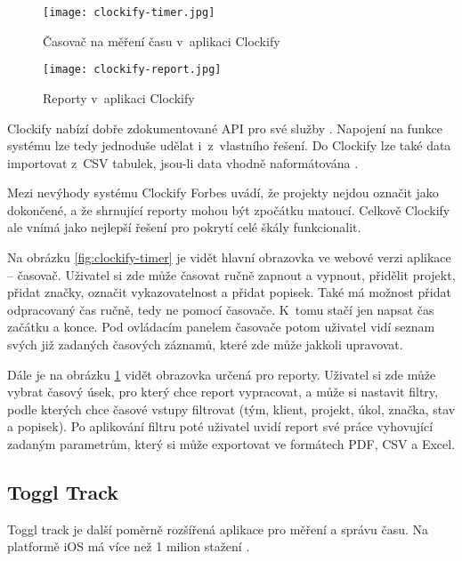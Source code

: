 \begin{figure}[p]
	\centering
	\texttt{[image: clockify-timer.jpg]}
	\caption{Časovač na měření času v~aplikaci Clockify \cite{clockify-features}}
	\label{fig:clockify-timer}
	\vspace{1cm}
	\texttt{[image: clockify-report.jpg]}
	\caption{Reporty v~aplikaci Clockify \cite{clockify-features}}
	\label{fig:clockify-report}
\end{figure}

Clockify nabízí dobře zdokumentované API pro své služby \cite{clockify-api}. Napojení na funkce systému lze tedy jednoduše udělat i~z~vlastního řešení. Do Clockify lze také data importovat z~CSV tabulek, jsou-li data vhodně naformátována \cite{clockify-import-timesheets}.

Mezi nevýhody systému Clockify Forbes uvádí, že projekty nejdou označit jako dokončené, a že shrnující reporty mohou být zpočátku matoucí. Celkově Clockify ale vnímá jako nejlepší řešení pro pokrytí celé škály funkcionalit.

Na obrázku \ref{fig:clockify-timer} je vidět hlavní obrazovka ve webové verzi aplikace – časovač. Uživatel si zde může časovat ručně zapnout a vypnout, přidělit projekt, přidat značky, označit vykazovatelnost a přidat popisek. Také má možnost přidat odpracovaný čas ručně, tedy ne pomocí časovače. K~tomu stačí jen napsat čas začátku a konce. Pod ovládacím panelem časovače potom uživatel vidí seznam svých již zadaných časových záznamů, které zde může jakkoli upravovat.

Dále je na obrázku \ref{fig:clockify-report} vidět obrazovka určená pro reporty. Uživatel si zde může vybrat časový úsek, pro který chce report vypracovat, a může si nastavit filtry, podle kterých chce časové vstupy filtrovat (tým, klient, projekt, úkol, značka, stav a popisek). Po aplikování filtru poté uživatel uvidí report své práce vyhovující zadaným parametrům, který si může exportovat ve formátech PDF, CSV a Excel.

\subsection{Toggl Track}

Toggl track je další poměrně rozšířená aplikace pro měření a správu času. Na platformě iOS má více než 1 milion stažení \cite{toggl-track-app-magic}. 

